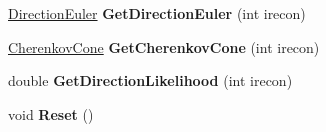 \begin{DoxyCompactItemize}
\item 
\hypertarget{classReconInfo_aace0a3e60fd49fbb5ef7a0a14afbd934}{\hyperlink{structDirectionEuler}{Direction\-Euler} {\bfseries Get\-Direction\-Euler} (int irecon)}\label{classReconInfo_aace0a3e60fd49fbb5ef7a0a14afbd934}

\item 
\hypertarget{classReconInfo_a98857e740b0c84d05a350a375ab00aab}{\hyperlink{structCherenkovCone}{Cherenkov\-Cone} {\bfseries Get\-Cherenkov\-Cone} (int irecon)}\label{classReconInfo_a98857e740b0c84d05a350a375ab00aab}

\item 
\hypertarget{classReconInfo_a8fd62e5800e1dfd8b4fbb73db36c6c80}{double {\bfseries Get\-Direction\-Likelihood} (int irecon)}\label{classReconInfo_a8fd62e5800e1dfd8b4fbb73db36c6c80}

\item 
\hypertarget{classReconInfo_a011aa23ea6b1dcc430b107d89faa24b0}{void {\bfseries Reset} ()}\label{classReconInfo_a011aa23ea6b1dcc430b107d89faa24b0}

\end{DoxyCompactItemize}
